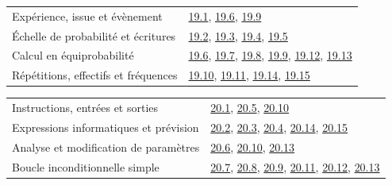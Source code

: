 \begin{tabularx}{\linewidth}{@{}Yl@{}}\toprule
Expérience, issue et évènement & \hyperref[exo-19-1]{19.1}, \hyperref[exo-19-6]{19.6}, \hyperref[exo-19-9]{19.9}\\[2mm]
Échelle de probabilité et écritures & \hyperref[exo-19-2]{19.2}, \hyperref[exo-19-3]{19.3}, \hyperref[exo-19-4]{19.4}, \hyperref[exo-19-5]{19.5}\\[2mm]
Calcul en équiprobabilité & \hyperref[exo-19-6]{19.6}, \hyperref[exo-19-7]{19.7}, \hyperref[exo-19-8]{19.8}, \hyperref[exo-19-9]{19.9}, \hyperref[exo-19-12]{19.12}, \hyperref[exo-19-13]{19.13}\\[2mm]
Répétitions, effectifs et fréquences & \hyperref[exo-19-10]{19.10}, \hyperref[exo-19-11]{19.11}, \hyperref[exo-19-14]{19.14}, \hyperref[exo-19-15]{19.15}\\[2mm]
\bottomrule\end{tabularx}\par\vspace{4mm}
\begin{tabularx}{\linewidth}{@{}Yl@{}}\toprule
Instructions, entrées et sorties & \hyperref[exo-20-1]{20.1}, \hyperref[exo-20-5]{20.5}, \hyperref[exo-20-10]{20.10}\\[2mm]
Expressions informatiques et prévision & \hyperref[exo-20-2]{20.2}, \hyperref[exo-20-3]{20.3}, \hyperref[exo-20-4]{20.4}, \hyperref[exo-20-14]{20.14}, \hyperref[exo-20-15]{20.15}\\[2mm]
Analyse et modification de paramètres & \hyperref[exo-20-6]{20.6}, \hyperref[exo-20-10]{20.10}, \hyperref[exo-20-13]{20.13}\\[2mm]
Boucle inconditionnelle simple & \hyperref[exo-20-7]{20.7}, \hyperref[exo-20-8]{20.8}, \hyperref[exo-20-9]{20.9}, \hyperref[exo-20-11]{20.11}, \hyperref[exo-20-12]{20.12}, \hyperref[exo-20-13]{20.13}\\[2mm]
\bottomrule\end{tabularx}\par\vspace{4mm}
\clearpage
